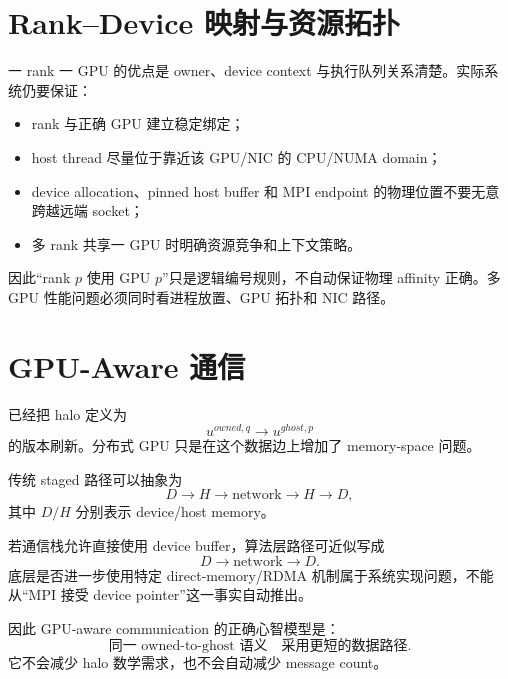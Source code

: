 \section{Rank--Device 映射与资源拓扑}

一 rank 一 GPU 的优点是 owner、device context 与执行队列关系清楚。实际系统仍要保证：
\begin{itemize}
\item rank 与正确 GPU 建立稳定绑定；
\item host thread 尽量位于靠近该 GPU/NIC 的 CPU/NUMA domain；
\item device allocation、pinned host buffer 和 MPI endpoint 的物理位置不要无意跨越远端 socket；
\item 多 rank 共享一 GPU 时明确资源竞争和上下文策略。
\end{itemize}

因此“rank $p$ 使用 GPU $p$”只是逻辑编号规则，不自动保证物理 affinity 正确。多 GPU 性能问题必须同时看进程放置、GPU 拓扑和 NIC 路径。

\section{GPU-Aware 通信}
\label{sec:gpu-aware-path}

已经把 halo 定义为
\begin{equation}
u^{owned,q}
\rightarrow
u^{ghost,p}
\end{equation}
的版本刷新。分布式 GPU 只是在这个数据边上增加了 memory-space 问题。

传统 staged 路径可以抽象为
\begin{equation}
D
\rightarrow
H
\rightarrow
\text{network}
\rightarrow
H
\rightarrow
D,
\label{eq:distributed-gpu-staged-path}
\end{equation}
其中 $D/H$ 分别表示 device/host memory。

若通信栈允许直接使用 device buffer，算法层路径可近似写成
\begin{equation}
D
\rightarrow
\text{network}
\rightarrow
D.
\label{eq:distributed-gpu-direct-path}
\end{equation}
底层是否进一步使用特定 direct-memory/RDMA 机制属于系统实现问题，不能从“MPI 接受 device pointer”这一事实自动推出。

因此 GPU-aware communication 的正确心智模型是：
\begin{equation}
\boxed{
\text{同一 owned-to-ghost 语义}
\quad
\text{采用更短的数据路径}.
}
\end{equation}
它不会减少 halo 数学需求，也不会自动减少 message count。


